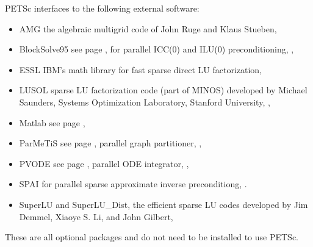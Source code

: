 \vspace{.3in}
\noindent
PETSc interfaces to the following external software:
\begin{itemize}
  \item AMG          the algebraic multigrid code of John Ruge and Klaus Stueben,
  \item BlockSolve95 see page \pageref{sec_blocksolve}, for parallel ICC(0) and ILU(0) preconditioning,
                     ,
  \item ESSL         IBM's math library for fast sparse direct LU factorization,
  \item LUSOL        sparse LU factorization code (part of MINOS) developed by Michael Saunders,
                      Systems Optimization Laboratory, Stanford University,
                     ,
  \item Matlab       see page \pageref{ch_matlab},
  \item ParMeTiS      see page \pageref{sec_partitioning}, parallel graph partitioner,
                     ,
  \item PVODE        see page \pageref{sec_pvode}, parallel ODE integrator,
                     ,
  \item SPAI         for parallel sparse approximate inverse preconditiong, 
                     .
  \item SuperLU and SuperLU\_Dist, the efficient sparse LU codes developed by Jim Demmel,  Xiaoye S. Li, and John Gilbert,  
\end{itemize}
These are all optional packages and do not need to be installed to use PETSc.



